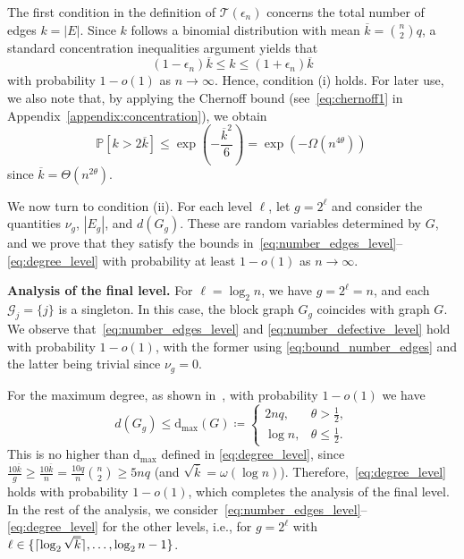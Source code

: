 \documentclass[journal]{IEEEtran}
\theoremstyle{definition}
\theoremstyle{definition}
\newcommand{\Gc}{\mathcal{G}}
\newcommand{\Tc}{\mathcal{T}}
\newcommand{\PP}{\mathbb{P}}
\newcommand{\dmax}{\mathrm{d_{max}}}
\newcommand{\PV}{\nu}
\newcommand{\kb}{\overline{k}}
\DeclarePairedDelimiter\ceil{\lceil}{\rceil}
\newcommand{\bigO}{\mathcal{O}}
\begin{document}
The first condition in the definition of $\Tc(\epsilon_n)$ concerns the total number of edges $k = |E|$.  
Since $k$ follows a binomial distribution with mean $\kb = \binom{n}{2}q$, a standard concentration inequalities argument yields that \cite{li2019learning}
\[
  (1-\epsilon_n)\kb \leq k \leq (1+\epsilon_n)\kb
\]
with probability $1-o(1)$ as $n \to \infty$. Hence, condition (i) holds. For later use, we also note that, by applying the Chernoff bound (see~\eqref{eq:chernoff1} in Appendix~\ref{appendix:concentration}), we obtain
\begin{equation}
\label{eq:bound_number_edges}
    \PP[k > 2\kb] \leq \exp \left( - \frac{\kb^2}{6}\right) = \exp \left( - \Omega(n^{4\theta}) \right) \, 
\end{equation}
since $\kb = \Theta(n^{2\theta})$.

\medskip
We now turn to condition (ii).  
For each level $\ell$, let $g=2^{\ell}$ and consider the quantities $\PV_g$, $|E_g|$, and $d(G_g)$.  
These are random variables determined by $G$, and we prove that they satisfy the bounds in~\eqref{eq:number_edges_level}--\eqref{eq:degree_level} with probability at least $1-o(1)$ as $n \to \infty$.

{\bf Analysis of the final level.} For $\ell=\log_2 n$, we have $g=2^{\ell}=n$, and each $\Gc_{j}=\{j\}$ is a singleton. In this case, the block graph $G_g$ coincides  with graph $G$. We observe that~\eqref{eq:number_edges_level} and \eqref{eq:number_defective_level} hold with probability $1-o(1)$, with the former using \eqref{eq:bound_number_edges} and the latter being trivial since $\PV_g=0$.

For the maximum degree, as shown in~\cite{li2019learning}, with probability $1-o(1)$ we have
\[
  d(G_g)\le \dmax(G)\coloneqq
  \begin{cases}
     2nq, & \theta>\tfrac{1}{2},\\
     \log n, & \theta\le \tfrac{1}{2}.
  \end{cases}
\]
This is no higher than $\dmax$ defined in \eqref{eq:degree_level}, since $\frac{10 \kb}{g} \ge \frac{10 \kb}{n} = \frac{10 q}{n} {n \choose 2} \ge 5 nq$ (and $\sqrt{\kb} = \omega(\log n)$).  Therefore,~\eqref{eq:degree_level} holds with probability $1-o(1)$, which completes the analysis of the final level.  In the rest of the analysis, we consider~\eqref{eq:number_edges_level}--\eqref{eq:degree_level} for the other levels, i.e., for $g = 2^\ell$ with $ \ell \in \{\ceil{\log_2 \sqrt{\kb}}, \dots ,\log_2 n-1 \}$.
\end{document}
